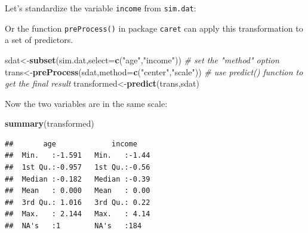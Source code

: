 \documentclass[12pt,]{krantz}
\newenvironment{Shaded}{\begin{snugshade}}{\end{snugshade}}
\newcommand{\KeywordTok}[1]{\textcolor[rgb]{0.13,0.29,0.53}{\textbf{#1}}}
\newcommand{\DataTypeTok}[1]{\textcolor[rgb]{0.13,0.29,0.53}{#1}}
\newcommand{\StringTok}[1]{\textcolor[rgb]{0.31,0.60,0.02}{#1}}
\newcommand{\CommentTok}[1]{\textcolor[rgb]{0.56,0.35,0.01}{\textit{#1}}}
\newcommand{\OperatorTok}[1]{\textcolor[rgb]{0.81,0.36,0.00}{\textbf{#1}}}
\newcommand{\NormalTok}[1]{#1}
\theoremstyle{definition}
\theoremstyle{definition}
\theoremstyle{definition}
\theoremstyle{remark}
\begin{document}
Let's standardize the variable \texttt{income} from \texttt{sim.dat}:

\begin{Shaded}
\end{Shaded}

Or the function \texttt{preProcess()} in package \texttt{caret} can
apply this transformation to a set of predictors.

\begin{Shaded}
\begin{Highlighting}[]
\NormalTok{sdat<-}\KeywordTok{subset}\NormalTok{(sim.dat,}\DataTypeTok{select=}\KeywordTok{c}\NormalTok{(}\StringTok{"age"}\NormalTok{,}\StringTok{"income"}\NormalTok{))}
\CommentTok{# set the "method" option}
\NormalTok{trans<-}\KeywordTok{preProcess}\NormalTok{(sdat,}\DataTypeTok{method=}\KeywordTok{c}\NormalTok{(}\StringTok{"center"}\NormalTok{,}\StringTok{"scale"}\NormalTok{))}
\CommentTok{# use predict() function to get the final result}
\NormalTok{transformed<-}\KeywordTok{predict}\NormalTok{(trans,sdat)}
\end{Highlighting}
\end{Shaded}

Now the two variables are in the same scale:

\begin{Shaded}
\begin{Highlighting}[]
\KeywordTok{summary}\NormalTok{(transformed)}
\end{Highlighting}
\end{Shaded}

\begin{verbatim}
##       age             income     
##  Min.   :-1.591   Min.   :-1.44  
##  1st Qu.:-0.957   1st Qu.:-0.56  
##  Median :-0.182   Median :-0.39  
##  Mean   : 0.000   Mean   : 0.00  
##  3rd Qu.: 1.016   3rd Qu.: 0.22  
##  Max.   : 2.144   Max.   : 4.14  
##  NA's   :1        NA's   :184
\end{verbatim}
\end{document}
